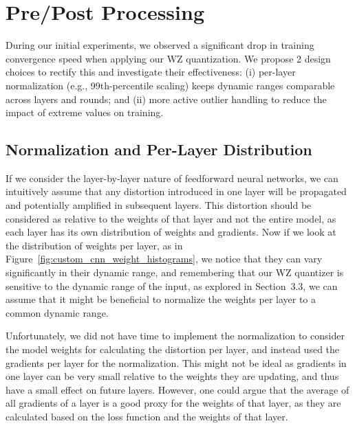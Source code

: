 \section{Pre/Post Processing}
During our initial experiments, we observed a significant drop in training convergence speed when applying our WZ quantization.
We propose 2 design choices to rectify this and investigate their effectiveness: (i) per-layer normalization (e.g., 99th-percentile scaling) keeps dynamic ranges comparable across layers and rounds; and (ii) more active outlier handling to reduce the impact of extreme values on training.

\subsection{Normalization and Per-Layer Distribution}
If we consider the layer-by-layer nature of feedforward neural networks, we can intuitively assume that any distortion introduced in one layer will be propagated and potentially amplified in subsequent layers. This distortion should be considered as relative to the weights of that layer and not the entire model, as each layer has its own distribution of weights and gradients.
Now if we look at the distribution of weights per layer, as in Figure~\ref{fig:custom_cnn_weight_histograms}, we notice that they can vary significantly in their dynamic range, and remembering that our WZ quantizer is sensitive to the dynamic range of the input, as explored in Section~3.3, we can assume that it might be beneficial to normalize the weights per layer to a common dynamic range.

Unfortunately, we did not have time to implement the normalization to consider the model weights for calculating the distortion per layer, and instead used the gradients per layer for the normalization. This might not be ideal as gradients in one layer can be very small relative to the weights they are updating, and thus have a small effect on future layers. However, one could argue that the average of all gradients of a layer is a good proxy for the weights of that layer, as they are calculated based on the loss function and the weights of that layer.

